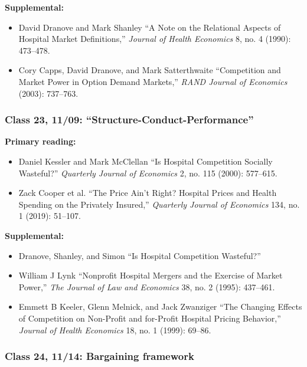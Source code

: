 \documentclass[11pt,]{article}
\providecommand{\tightlist}{%
  \setlength{\itemsep}{0pt}\setlength{\parskip}{0pt}}
\begin{document}
\textbf{Supplemental:}

\begin{itemize}
\tightlist
\item
  David Dranove and Mark Shanley {``A Note on the Relational Aspects of
  Hospital Market Definitions,''} \emph{Journal of Health Economics} 8,
  no. 4 (1990): 473--478.
\item
  Cory Capps, David Dranove, and Mark Satterthwaite {``Competition and
  Market Power in Option Demand Markets,''} \emph{RAND Journal of
  Economics} (2003): 737--763.
\end{itemize}

\hypertarget{class-23-1109-structure-conduct-performance}{%
\subsubsection{Class 23, 11/09:
``Structure-Conduct-Performance''}\label{class-23-1109-structure-conduct-performance}}

\textbf{Primary reading:}

\begin{itemize}
\tightlist
\item
  Daniel Kessler and Mark McClellan {``Is Hospital Competition Socially
  Wasteful?''} \emph{Quarterly Journal of Economics} 2, no. 115 (2000):
  577--615.
\item
  Zack Cooper et al. {``The Price Ain't Right? {Hospital} Prices and
  Health Spending on the Privately Insured,''} \emph{Quarterly Journal
  of Economics} 134, no. 1 (2019): 51--107.
\end{itemize}

\textbf{Supplemental:}

\begin{itemize}
\tightlist
\item
  Dranove, Shanley, and Simon {``Is Hospital Competition Wasteful?''}
\item
  William J Lynk {``Nonprofit Hospital Mergers and the Exercise of
  Market Power,''} \emph{The Journal of Law and Economics} 38, no. 2
  (1995): 437--461.
\item
  Emmett B Keeler, Glenn Melnick, and Jack Zwanziger {``The Changing
  Effects of Competition on Non-Profit and for-Profit Hospital Pricing
  Behavior,''} \emph{Journal of Health Economics} 18, no. 1 (1999):
  69--86.
\end{itemize}

\hypertarget{class-24-1114-bargaining-framework}{%
\subsubsection{Class 24, 11/14: Bargaining
framework}\label{class-24-1114-bargaining-framework}}
\end{document}
